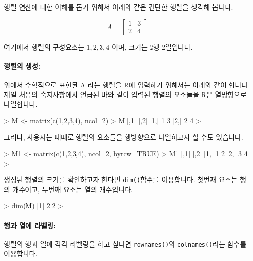 \documentclass{report}
\begin{document}
행렬 연산에 대한 이해를 돕기 위해서 아래와 같은 간단한 행렬을 생각해 봅니다. 

\begin{equation}
A = 
\begin{bmatrix}
1 & 3 \\
2 & 4 
\end{bmatrix}
\end{equation}

여기에서 행렬의 구성요소는 $1,2,3,4$ 이며, 크기는 2행 2열입니다. 

\paragraph{행렬의 생성:} 위에서 수학적으로 표현된 A 라는 행렬을 R에 입력하기 위해서는 아래와 같이 합니다. 
제일 처음의 숙지사항에서 언급된 바와 같이 입력된 행렬의 요소들을 R은 열방향으로 나열합니다. 

\begin{Schunk}
\begin{Soutput}
> M <- matrix(c(1,2,3,4), ncol=2)
> M
     [,1] [,2]
[1,]    1    3
[2,]    2    4
>
\end{Soutput}
\end{Schunk}

그러나, 사용자는 때때로 행렬의 요소들을 행방향으로 나열하고자 할 수도 있습니다. 

\begin{Schunk}
\begin{Soutput}
> M1 <- matrix(c(1,2,3,4), ncol=2, byrow=TRUE)
> M1
     [,1] [,2]
[1,]    1    2
[2,]    3    4
>
\end{Soutput}
\end{Schunk}

생성된 행렬의 크기를 확인하고자 한다면 \texttt{dim()}함수를 이용합니다.
첫번째 요소는 행의 개수이고, 두번째 요소는 열의 개수입니다. 

\begin{Schunk}
\begin{Soutput}
> dim(M)
[1] 2 2
>
\end{Soutput}
\end{Schunk}

\paragraph{행과 열에 라벨링:}  행렬의 행과 열에 각각 라벨링을 하고 싶다면 \texttt{rownames()}와 \texttt{colnames()}라는 함수를 이용합니다.
\end{document}
